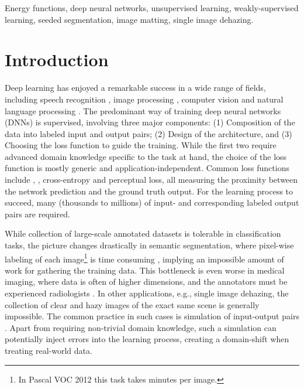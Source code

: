 \documentclass[journal]{IEEEtran}
\begin{document}
\begin{IEEEkeywords}
Energy functions, deep neural networks, unsupervised learning, weakly-supervised learning, seeded segmentation, image matting, single image dehazing.
\end{IEEEkeywords}



\section{Introduction}

Deep learning \cite{deep_learning} has enjoyed a remarkable success in a wide range of fields, including speech recognition \cite{speech_recognition}, image processing \cite{fast_image_processing}, computer vision \cite{alexnet} and natural language processing \cite{NLP}. 
The predominant way of training deep neural networks (DNNs) is supervised, involving three major components: (1) Composition of the data into labeled input and output pairs; (2) Design of the architecture, and (3) Choosing the loss function to guide the training. While the first two require advanced domain knowledge specific to the task at hand, the choice of the loss function is mostly generic and application-independent. Common loss functions include , , cross-entropy and perceptual loss, all measuring the proximity between the network prediction and the ground truth output. For the learning process to succeed, many (thousands to millions) of input- and corresponding labeled output pairs are required.

While collection of large-scale annotated datasets is tolerable in classification tasks, the picture changes drastically in semantic segmentation, where pixel-wise labeling of each image\footnote{In Pascal VOC 2012 this task takes  minutes per image.} is time consuming \cite{whats_the_point}, implying an impossible amount of work for gathering the training data. This bottleneck is even worse in medical imaging, where data is often of higher dimensions, and the annotators must be experienced radiologists \cite{medical_1,medical_2}. In other applications, e.g., single image dehazing, the collection of clear and hazy images of the exact same scene is generally impossible. The common practice in such cases is simulation of input-output pairs \cite{CAP,mscnn,dehazenet,aodnet,GFN}. Apart from requiring non-trivial domain knowledge, such a simulation can potentially inject errors into the learning process, creating a domain-shift when treating real-world data. 
\end{document}
